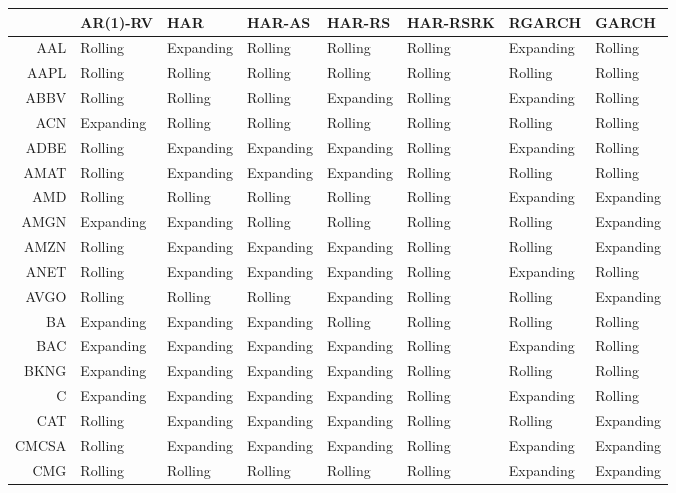 \begin{table}[ht]
\centering
\begin{tabular}{rlllllll}
  \hline
 & AR(1)-RV & HAR & HAR-AS & HAR-RS & HAR-RSRK & RGARCH & GARCH \\ 
  \hline
AAL & Rolling & Expanding & Rolling & Rolling & Rolling & Expanding & Rolling \\ 
  AAPL & Rolling & Rolling & Rolling & Rolling & Rolling & Rolling & Rolling \\ 
  ABBV & Rolling & Rolling & Rolling & Expanding & Rolling & Expanding & Rolling \\ 
  ACN & Expanding & Rolling & Rolling & Rolling & Rolling & Rolling & Rolling \\ 
  ADBE & Rolling & Expanding & Expanding & Expanding & Rolling & Expanding & Rolling \\ 
  AMAT & Rolling & Expanding & Expanding & Expanding & Rolling & Rolling & Rolling \\ 
  AMD & Rolling & Rolling & Rolling & Rolling & Rolling & Expanding & Expanding \\ 
  AMGN & Expanding & Expanding & Rolling & Rolling & Rolling & Rolling & Expanding \\ 
  AMZN & Rolling & Expanding & Expanding & Expanding & Rolling & Rolling & Expanding \\ 
  ANET & Rolling & Expanding & Expanding & Expanding & Rolling & Expanding & Rolling \\ 
  AVGO & Rolling & Rolling & Rolling & Expanding & Rolling & Rolling & Expanding \\ 
  BA & Expanding & Expanding & Expanding & Rolling & Rolling & Rolling & Rolling \\ 
  BAC & Expanding & Expanding & Expanding & Expanding & Rolling & Expanding & Rolling \\ 
  BKNG & Expanding & Expanding & Expanding & Expanding & Rolling & Rolling & Rolling \\ 
  C & Expanding & Expanding & Expanding & Expanding & Rolling & Expanding & Rolling \\ 
  CAT & Rolling & Expanding & Expanding & Expanding & Rolling & Rolling & Expanding \\ 
  CMCSA & Rolling & Expanding & Expanding & Expanding & Rolling & Expanding & Expanding \\ 
  CMG & Rolling & Rolling & Rolling & Rolling & Rolling & Expanding & Expanding \\ 

\end{tabular}
\end{table}

